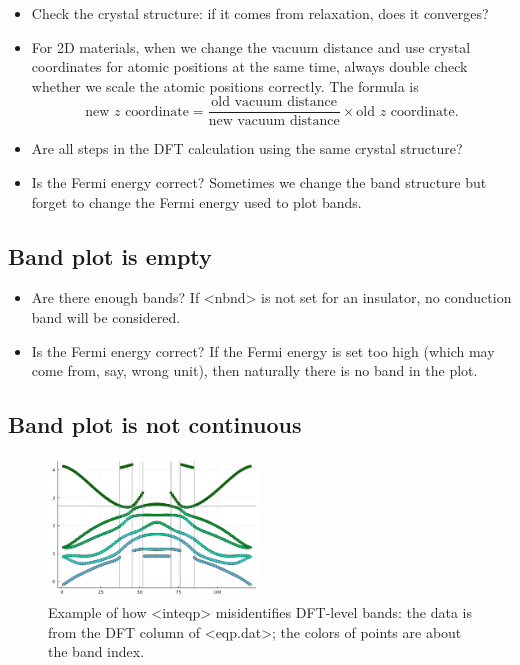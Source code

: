 \documentclass[hyperref, a4paper, 12pt]{report}
\def\texttt#1{<#1>}%
\newcommand{\shortcode}[1]{\texttt{#1}}
\begin{document}
\begin{itemize}
    \item Check the crystal structure: if it comes from relaxation,
    does it converges?
    \item For 2D materials, 
    when we change the vacuum distance
    and use crystal coordinates for atomic positions at the same time, 
    always double check whether we scale the atomic positions correctly.
    The formula is 
    \begin{equation}
        \text{new $z$ coordinate} = \frac{\text{old vacuum distance}}{\text{new vacuum distance}} \times \text{old $z$ coordinate}.
    \end{equation}
    \item Are all steps in the DFT calculation using the same crystal structure?
    \item Is the Fermi energy correct? 
    Sometimes we change the band structure but forget to change the Fermi energy used to plot bands.
\end{itemize}

\subsection{Band plot is empty}

\begin{itemize}
    \item Are there enough bands? 
    If \shortcode{nbnd} is not set for an insulator,
    no conduction band will be considered.
    \item Is the Fermi energy correct? If the Fermi energy is set too high 
    (which may come from, say, wrong unit), 
    then naturally there is no band in the plot.
\end{itemize}

\subsection{Band plot is not continuous}\label{sec:discontinuous-band}

\begin{figure}
    \centering
    \includegraphics[width=0.5\textwidth]{plots/dft-level-bands.pdf}
    \caption{Example of how \shortcode{inteqp} misidentifies DFT-level bands:
    the data is from the DFT column of \shortcode{eqp.dat};
    the colors of points are about the band index.}
    \label{fig:inteqp-shuffle-band-index-1}
\end{figure}
\end{document}
